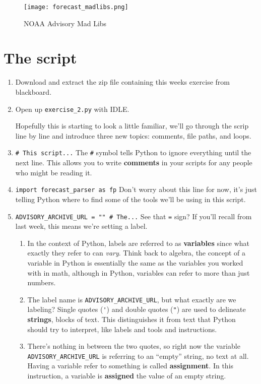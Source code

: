 \documentclass{article}
\begin{document}
\begin{figure}
    \texttt{[image: forecast\_madlibs.png]}
    \caption{NOAA Advisory Mad Libs}
    \label{fig:madlib}
\end{figure}

\section{The script}
\begin{enumerate}
    \item Download and extract the zip file containing this weeks exercise from blackboard.  
    \item Open up \verb+exercise_2.py+ with IDLE.  
    
        Hopefully this is starting to look a little familiar, we'll go through the scrip line by line and introduce three new topics: comments, file paths, and loops.
    \item \verb+# This script...+ The \verb+#+ symbol tells Python to ignore everything until the next line.  This allows you to write \textbf{comments} in your scripts for any people who might be reading it.
    \item \verb+import forecast_parser as fp+ Don't worry about this line for now, it's just telling Python where to find some of the tools we'll be using in this script.
    \item \verb+ADVISORY_ARCHIVE_URL = "" # The...+ See that \verb+=+ sign?  If you'll recall from last week, this means we're setting a label.  
    \begin{enumerate}
        \item In the context of Python, labels are referred to as \textbf{variables} since what exactly they refer to can \textit{vary}.  Think back to algebra, the concept of a variable in Python is essentially the same as the variables you worked with in math, although in Python, variables can refer to more than just numbers.  
        \item The label name is \verb+ADVISORY_ARCHIVE_URL+, but what exactly are we labeling?  Single quotes (\verb+'+) and double quotes (\verb+"+) are used to delineate \textbf{strings}, blocks of text.   This distinguishes it from text that Python should try to interpret, like labels and tools and instructions.  
        \item There's nothing in between the two quotes, so right now the variable \verb+ADVISORY_ARCHIVE_URL+ is referring to an ``empty'' string, no text at all.  Having a variable refer to something is called \textbf{assignment}.  In this instruction, a variable is \textbf{assigned} the value of an empty string.

\end{enumerate}
\end{enumerate}
\end{document}
